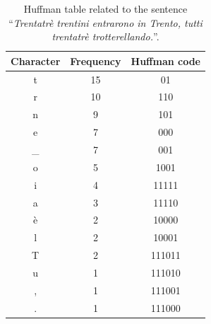 \begin{table}
\centering
 \begin{tabular}{|c|c|c|}
  \hline
  Character & Frequency & Huffman code\\
  \hline
  t & 15 & 01 \\
  r & 10 & 110 \\
  n & 9 & 101 \\
  e & 7 & 000 \\
  \_ & 7 & 001\\
  o & 5 & 1001 \\
  i & 4 & 11111 \\
  a & 3 & 11110 \\
  è & 2 & 10000 \\
  l & 2 & 10001 \\
  T & 2 & 111011 \\
  u & 1 & 111010 \\
  , & 1 & 111001 \\
  . & 1 & 111000 \\
  \hline
 \end{tabular}
 \caption{Huffman table related to the sentence ``\textit{Trentatrè trentini entrarono in Trento, tutti trentatrè trotterellando.}''.}
 \label{tab:huff}
\end{table}
%
